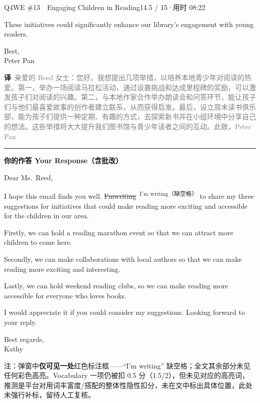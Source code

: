\documentclass[11pt]{article}
\newcommand{\fix}[2]{%
  \colorbox{cWrongBg}{\textcolor{cWrong}{\sout{#1}}}%
  \,\textsuperscript{\textcolor{cFix}{\footnotesize #2}}}
\newcommand{\ptesub}[1]{%
  \par\needspace{2\baselineskip}\smallskip
  {\color{cAccent}\rule[-0.2ex]{3pt}{1.05em}}\hspace{6pt}%
  {\bfseries\color{cHead}#1}\par\nopagebreak\smallskip}
\newcommand{\zh}[1]{{\footnotesize\textcolor{cNote}{\textbf{译}}\ \textcolor{gray}{#1}}}
\begin{document}
\begin{qblock}{Q4\quad WE \#13\ \ Engaging Children in Reading}{14.5 / 15\quad·\quad 用时 08:22}
\begin{modelbox}
These initiatives could significantly enhance our library's engagement with young readers.

Best,\\ Peter Pan
\end{modelbox}
\zh{亲爱的 Reed 女士：您好。我想提出几项举措，以培养本地青少年对阅读的热爱。第一，举办一场阅读马拉松活动，通过设置挑战和达成里程碑的奖励，可以激发孩子们对阅读的兴趣。第二，与本地作家合作举办朗读会和问答环节，能让孩子们与他们最喜爱故事的创作者建立联系，从而获得启发。最后，设立周末读书俱乐部，能为孩子们提供一种定期、有趣的方式，去探索新书并在小组环境中分享自己的想法。这些举措将大大提升我们图书馆与青少年读者之间的互动。此致，Peter Pan}

\ptesub{你的作答 Your Response（含批改）}
\begin{youbox}
Dear Ms.\ Reed,

I hope this email finds you well. \fix{I'mwriting}{I'm writing（缺空格）} to share my three suggestions for initiatives that could make reading more exciting and accessible for the children in our area.

Firstly, we can hold a reading marathon event so that we can attract more children to come here.

Secondly, we can make collaborations with local authors so that we can make reading more exciting and interesting.

Lastly, we can hold weekend reading clubs, so we can make reading more accessible for everyone who loves books.

I would appreciate it if you could consider my suggestions. Looking forward to your reply.

Best regards,\\ Kathy
\end{youbox}
{\footnotesize\color{gray} 注：弹窗中\textbf{仅可见一处}红色标注框——``I'm writing'' 缺空格；全文其余部分未见任何彩色高亮。Vocabulary 一项仍被扣 0.5 分（1.5/2），但未见对应的高亮词，推测是平台对用词丰富度/搭配的整体性隐性扣分，未在文中标出具体位置，此处未强行补标，留待人工复核。}


\end{qblock}
\end{document}
